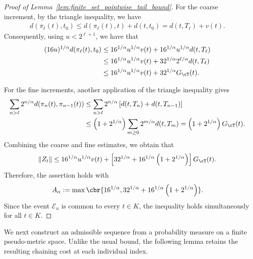 \documentclass[11pt]{article}
\begin{document}
\begin{proof}[Proof of Lemma~\ref{lem:finite_set_pointwise_tail_bound}]
For the coarse increment, by the triangle inequality, we have
\begin{align*}
d(\pi_\ell(t),t_0)\le
d(\pi_\ell(t),t)+d(t,t_0)=
d(t,T_\ell)+v(t).
\end{align*}
Consequently, using $u<2^{\ell+1}$, we have that
\begin{align*}
(16u)^{1/\alpha}d(\pi_\ell(t),t_0)
&\le
16^{1/\alpha}u^{1/\alpha}v(t)
+16^{1/\alpha}u^{1/\alpha}d(t,T_\ell)\\
&\le
16^{1/\alpha}u^{1/\alpha}v(t)
+32^{1/\alpha}2^{\ell/\alpha}d(t,T_\ell)\\
&\le
16^{1/\alpha}u^{1/\alpha}v(t)
+32^{1/\alpha}G_{\cT}(t).
\end{align*}

For the fine increments, another application of the triangle inequality
gives
\begin{align*}
\sum_{n>\ell}2^{n/\alpha}
d(\pi_n(t),\pi_{n-1}(t))&\le
\sum_{n>\ell}2^{n/\alpha}
\left[
d(t,T_n)+d(t,T_{n-1})
\right]\\
&\le
\left(1+2^{1/\alpha}\right)
\sum_{m\ge0}2^{m/\alpha}d(t,T_m)=
\left(1+2^{1/\alpha}\right)G_{\cT}(t).
\end{align*}
Combining the coarse and fine estimates, we obtain that
\begin{align*}
\|Z_t\|
\le
16^{1/\alpha}u^{1/\alpha}v(t)
+
\left[
32^{1/\alpha}
+16^{1/\alpha}\left(1+2^{1/\alpha}\right)
\right]
G_{\cT}(t).
\end{align*}
Therefore, the assertion holds with
\begin{align*}
A_\alpha
:=
\max\cbr{
16^{1/\alpha},
32^{1/\alpha}
+16^{1/\alpha}\left(1+2^{1/\alpha}\right)
}.
\end{align*}
Since the event $\mathcal E_u$ is common to every $t\in K$, the
inequality holds simultaneously for all $t\in K$.
\end{proof}

We next construct an admissible sequence from a probability measure on
a finite pseudo-metric space. Unlike the usual
bound, the following lemma retains the resulting chaining cost at each
individual index.
\end{document}
